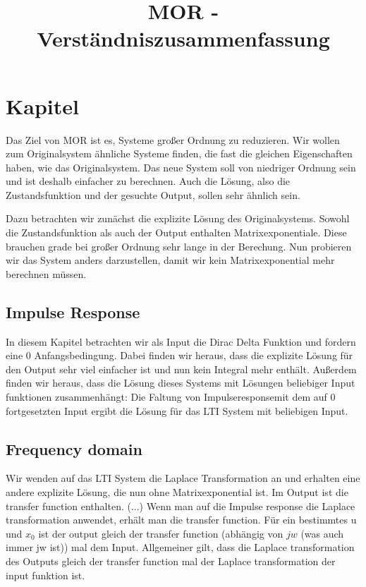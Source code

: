 \documentclass[]{article}
\title{MOR - Verständniszusammenfassung}
\author{}
\begin{document}
\maketitle

\section{Kapitel}
Das Ziel von MOR ist es, Systeme großer Ordnung zu reduzieren. Wir wollen zum Originalsystem ähnliche Systeme finden, die fast die gleichen Eigenschaften haben, wie das Originalsystem. Das neue System soll von niedriger Ordnung sein und ist deshalb einfacher zu berechnen. Auch die Lösung, also die Zustandsfunktion und der gesuchte Output, sollen sehr ähnlich sein. 

Dazu betrachten wir zunächst die explizite Lösung des Originalsystems. Sowohl die Zustandsfunktion als auch der Output enthalten Matrixexponentiale. Diese brauchen grade bei großer Ordnung sehr lange in der Berechung. Nun probieren wir das System anders darzustellen, damit wir kein Matrixexponential mehr berechnen müssen. 

\subsection{Impulse Response}
In diesem Kapitel betrachten wir als Input die Dirac Delta Funktion und fordern eine 0 Anfangsbedingung. Dabei finden wir heraus, dass die explizite Lösung für den Output sehr viel einfacher ist und nun kein Integral mehr enthält. Außerdem finden wir heraus, dass die Lösung dieses Systems mit Lösungen beliebiger Input funktionen zusammenhängt: Die Faltung von \glqq Impulseresponse\grqq mit dem auf 0 fortgesetzten Input ergibt die Lösung für das LTI System mit beliebigen Input.  

\subsection{Frequency domain}
Wir wenden auf das LTI System die Laplace Transformation an und erhalten eine andere explizite Lösung, die nun ohne Matrixexponential ist. Im Output ist die transfer function enthalten. (...) Wenn man auf die Impulse response die Laplace transformation anwendet, erhält man die transfer function. Für ein bestimmtes u und $x_0$ ist der output gleich der transfer function (abhängig von \(jw \) (was auch immer jw ist)) mal dem Input. Allgemeiner gilt, dass die Laplace transformation des Outputs gleich der transfer function mal der Laplace transformation der input funktion ist.   
\end{document}

